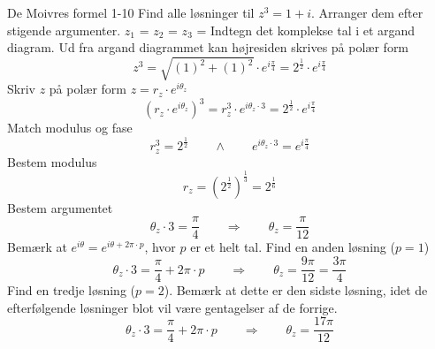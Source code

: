 \documentclass{article}
\begin{document}
\begin{exercise}{De Moivres formel 1-10}
Find alle løsninger til $z^3 = 1 + i$.
Arranger dem efter stigende argumenter.
$z_1$ = 
$z_2$ = 
$z_3$ = 
\hint
Indtegn det komplekse tal i et argand diagram.
\hint
Ud fra argand diagrammet kan højresiden skrives på polær form
\[z^3 = \sqrt{(1)^2 + (1)^2} \cdot e^{i \frac{\pi}{4}} = 2^{\frac{1}{2}} \cdot e^{i \frac{\pi}{4}}
\]
\hint
Skriv $z$ på polær form $z = r_z \cdot e^{i \theta_z}$
\[\left(r_z \cdot e^{i \theta_z}\right)^3 = r_z^3 \cdot e^{i \theta_z \cdot 3} = 2^{\frac{1}{2}} \cdot e^{i \frac{ \pi}{4}}
\]
\hint
Match modulus og fase
\[r_z^3 = 2^{\frac{1}{2}} \qquad \wedge \qquad e^{i \theta_z \cdot 3} = e^{i \frac{\pi}{4}}
\]
\hint
Bestem modulus
\[r_z = \left(2^{\frac{1}{2}} \right)^{\frac{1}{3}} = 2^{\frac{1}{6}}
\]
\hint
Bestem argumentet
\[\theta_z \cdot 3 = \frac{\pi}{4} \qquad \Rightarrow \qquad \theta_z = \frac{\pi}{12}
\]
\hint
Bemærk at $e^{i \theta} = e^{i \theta + 2 \pi \cdot p}$, hvor $p$ er et helt tal.
\hint
Find en anden løsning ($p = 1$)
\[\theta_z \cdot 3 = \frac{\pi}{4} + 2 \pi \cdot p \qquad \Rightarrow \qquad \theta_z = \frac{9 \pi}{12} = \frac{3\pi}{4}
\]
\hint
Find en tredje løsning ($p = 2$).
Bemærk at dette er den sidste løsning, idet de efterfølgende
løsninger blot vil være gentagelser af de forrige.
\[\theta_z \cdot 3 = \frac{\pi}{4} + 2 \pi \cdot p \qquad \Rightarrow \qquad \theta_z = \frac{17 \pi}{12}
\]
\end{exercise}
\end{document}
